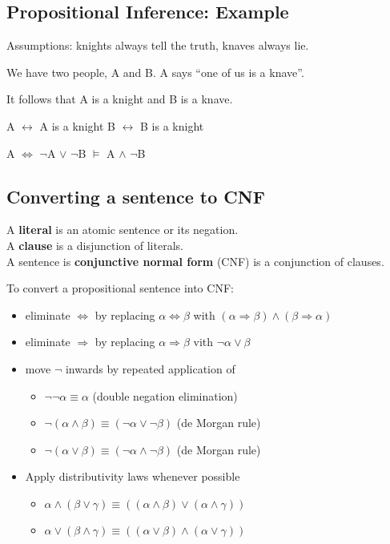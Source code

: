\subsection{Propositional Inference: Example}
Assumptions: knights always tell the truth, knaves always lie.

We have two people, A and B. A says ``one of us is a knave''.

It follows that A is a knight and B is a knave.

A $\leftrightarrow$ A is a knight
B $\leftrightarrow$ B is a knight

A $\Leftrightarrow$ $\neg$A $\lor$ $\neg$B $\models$ A $\land$ $\neg$B

\subsection{Converting a sentence to CNF}
A \textbf{literal} is an atomic sentence or its negation.\\
A \textbf{clause} is a disjunction of literals.\\
A sentence is \textbf{conjunctive normal form} (CNF) is a conjunction of
clauses.

To convert a propositional sentence into CNF:
\begin{itemize}
    \item eliminate $\Leftrightarrow$ by replacing $\alpha \Leftrightarrow \beta$ with $(\alpha \Rightarrow \beta) \land (\beta \Rightarrow \alpha)$
    \item eliminate $\Rightarrow$ by replacing $\alpha \Rightarrow \beta$ vith $\neg \alpha \lor \beta$
    \item move $\neg$ inwards by repeated application of
        \begin{itemize}
            \item $\neg\neg\alpha \equiv \alpha$ (double negation elimination)
            \item $\neg(\alpha \land \beta) \equiv (\neg\alpha \lor \neg\beta)$ (de Morgan rule)
            \item $\neg(\alpha \lor \beta) \equiv (\neg\alpha \land \neg\beta)$ (de Morgan rule)
        \end{itemize}
    \item Apply distributivity laws whenever possible
        \begin{itemize}
            \item $\alpha \land (\beta \lor \gamma) \equiv ((\alpha \land \beta)\lor(\alpha\land\gamma))$
            \item $\alpha \lor (\beta \land \gamma) \equiv ((\alpha \lor \beta) \land (\alpha \lor \gamma))$
        \end{itemize}
\end{itemize}

